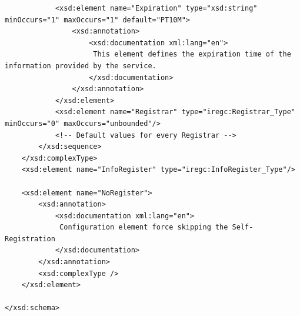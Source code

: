 \documentclass{book}
\begin{document}
\begin{verbatim}
            <xsd:element name="Expiration" type="xsd:string" minOccurs="1" maxOccurs="1" default="PT10M">
                <xsd:annotation>
                    <xsd:documentation xml:lang="en">
                     This element defines the expiration time of the information provided by the service.
                    </xsd:documentation>
                </xsd:annotation>
            </xsd:element>
            <xsd:element name="Registrar" type="iregc:Registrar_Type" minOccurs="0" maxOccurs="unbounded"/>
            <!-- Default values for every Registrar -->
        </xsd:sequence>
    </xsd:complexType>
    <xsd:element name="InfoRegister" type="iregc:InfoRegister_Type"/>

    <xsd:element name="NoRegister">
        <xsd:annotation>
            <xsd:documentation xml:lang="en">
             Configuration element force skipping the Self-Registration
            </xsd:documentation>
        </xsd:annotation>
        <xsd:complexType />
    </xsd:element>

</xsd:schema>



\end{verbatim}

\end{document}

